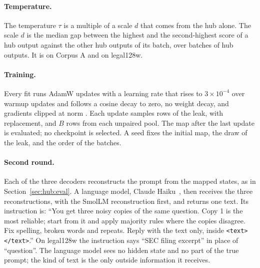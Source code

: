 \paragraph{Temperature.} The temperature $\tau$ is a multiple of a scale $d$ that comes from the hub alone.
The scale $d$ is the median gap between the highest and the second-highest score of a hub output against the other hub outputs of its batch, over  batches of  hub outputs. %
It is  on Corpus A and  on legal128w. %

\paragraph{Training.} Every fit runs  AdamW updates with a learning rate that rises to $3\times10^{-4}$ over  warmup updates and follows a cosine decay to zero, no weight decay, and gradients clipped at norm . %
Each update samples  rows of the leak, with replacement, and $B$ rows from each unpaired pool. %
The map after the last update is evaluated; no checkpoint is selected.
A seed fixes the initial map, the draw of the leak, and the order of the batches.

\paragraph{Second round.} Each of the three decoders reconstructs the prompt from the mapped states, as in Section~\ref{sec:hub:eval}.
A language model, Claude Haiku~, then receives the three reconstructions, with the SmolLM reconstruction first, and returns one text. %
Its instruction is: ``You get three noisy copies of the same question. Copy 1 is the most reliable; start from it and apply majority rules where the copies disagree. Fix spelling, broken words and repeats. Reply with the text only, inside \texttt{<text></text>}.''
On legal128w the instruction says ``SEC filing excerpt'' in place of ``question''.
The language model sees no hidden state and no part of the true prompt; the kind of text is the only outside information it receives.
